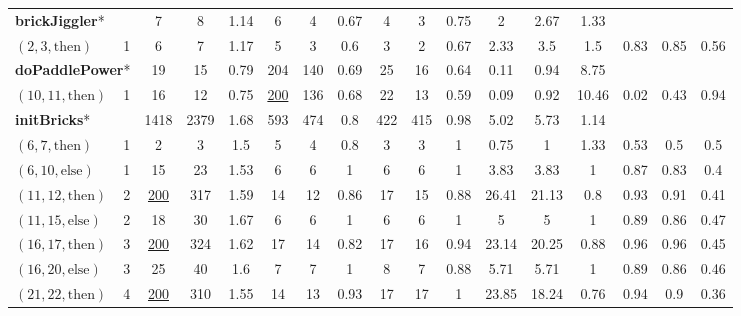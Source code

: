 \documentclass[sigconf]{acmart}
\newcommand{\thenBr}{\text{then}}
\newcommand{\elseBr}{\text{else}}
\newcommand{\un}[1]{\underline{#1}}
\begin{document}
\begin{table}[!t]
\begin{tabular}{lc|ccc|ccc|ccc|ccc|ccc}
    \toprule
\multicolumn{2}{l|}{\textbf{brickJiggler}*}   
                                 & 7        & 8    & 1.14      & 6  & 4 & 0.67              & 4  & 3  & 0.75               & 2      & 2.67 & 1.33   &      &      &       \\
    $(2,3,\thenBr)$   & 1        & 6        & 7    & 1.17      & 5  & 3 & 0.6               & 3  & 2  & 0.67               & 2.33   & 3.5  & 1.5    & 0.83 & 0.85 & 0.56  \\
    \hline
\multicolumn{2}{l|}{\textbf{doPaddlePower}*}  
                                 & 19       & 15   & 0.79      & 204  & 140 & 0.69          & 25 & 16  & 0.64              & 0.11   & 0.94 & 8.75   &       &      &      \\
    $(10,11,\thenBr)$ & 1        & 16       & 12   & 0.75      & \un{200} & 136 & 0.68      & 22 & 13  & 0.59              & 0.09   & 0.92 & 10.46  &  0.02 & 0.43 & 0.94 \\
    \hline
\multicolumn{2}{l|}{\textbf{initBricks}*}     
                                 & 1418     & 2379 & 1.68      & 593  & 474 & 0.8           & 422 & 415 & 0.98             & 5.02   & 5.73  & 1.14   &      &      &       \\
    $(6,7,\thenBr)$   & 1        & 2        & 3    & 1.5       & 5    & 4   & 0.8           & 3   & 3   & 1                & 0.75   & 1     & 1.33   & 0.53 & 0.5  & 0.5   \\
    $(6,10,\elseBr)$  & 1        & 15       & 23   & 1.53      & 6    & 6   & 1             & 6   & 6   & 1                & 3.83   & 3.83  & 1      & 0.87 & 0.83 & 0.4   \\
    $(11,12,\thenBr)$ & 2        & \un{200} & 317  & 1.59      & 14   & 12  & 0.86          & 17  & 15  & 0.88             & 26.41  & 21.13 & 0.8    & 0.93 & 0.91 & 0.41  \\
    $(11,15,\elseBr)$ & 2        & 18       & 30   & 1.67      & 6    & 6   & 1             & 6   & 6   & 1                & 5      & 5     & 1      & 0.89 & 0.86 & 0.47  \\
    $(16,17,\thenBr)$ & 3        & \un{200} & 324  & 1.62      & 17   & 14  & 0.82          & 17  & 16  & 0.94             & 23.14  & 20.25 & 0.88   & 0.96 & 0.96 & 0.45  \\
    $(16,20,\elseBr)$ & 3        & 25       & 40   & 1.6       & 7    & 7   & 1             & 8   & 7   & 0.88             & 5.71   & 5.71  & 1      & 0.89 & 0.86 & 0.46  \\
    $(21,22,\thenBr)$ & 4        & \un{200} & 310  & 1.55      & 14   & 13  & 0.93          & 17  & 17  & 1                & 23.85  & 18.24 & 0.76   & 0.94 & 0.9  & 0.36  \\

\end{tabular}
\end{table}
\end{document}
